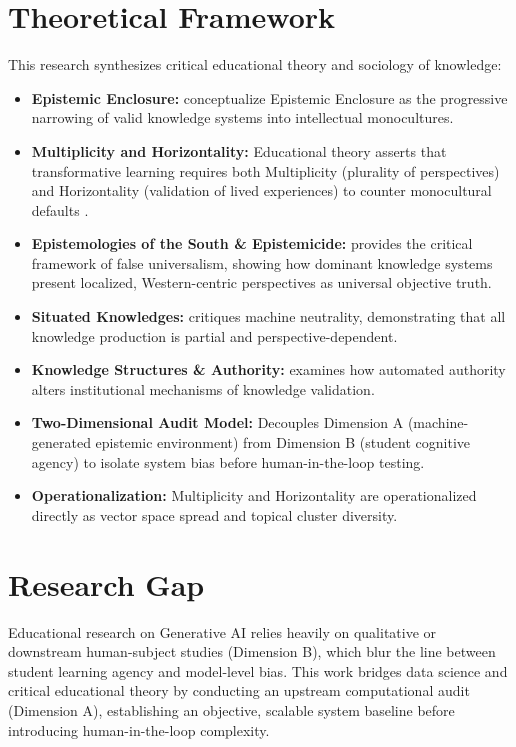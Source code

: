 \section{Theoretical Framework}
This research synthesizes critical educational theory and sociology of knowledge:
\begin{itemize}
  \item \textbf{Epistemic Enclosure:} \cite{Warren2020} conceptualize Epistemic Enclosure as the progressive narrowing of valid knowledge systems into intellectual monocultures.
  \item \textbf{Multiplicity and Horizontality:} Educational theory asserts that transformative learning requires both Multiplicity (plurality of perspectives) and Horizontality (validation of lived experiences) to counter monocultural defaults \cite{Warren2020}.
  \item \textbf{Epistemologies of the South \& Epistemicide:} \cite{Santos2014} provides the critical framework of false universalism, showing how dominant knowledge systems present localized, Western-centric perspectives as universal objective truth.
  \item \textbf{Situated Knowledges:} \cite{Haraway1988} critiques machine neutrality, demonstrating that all knowledge production is partial and perspective-dependent.
  \item \textbf{Knowledge Structures \& Authority:} \cite{Maton2014} examines how automated authority alters institutional mechanisms of knowledge validation.
  \item \textbf{Two-Dimensional Audit Model:} Decouples Dimension A (machine-generated epistemic environment) from Dimension B (student cognitive agency) to isolate system bias before human-in-the-loop testing.
  \item \textbf{Operationalization:} Multiplicity and Horizontality are operationalized directly as vector space spread and topical cluster diversity.
\end{itemize}

\section{Research Gap} %
Educational research on Generative AI relies heavily on qualitative or downstream human-subject studies (Dimension B), which blur the line between student learning agency and model-level bias. This work bridges data science and critical educational theory by conducting an upstream computational audit (Dimension A), establishing an objective, scalable system baseline before introducing human-in-the-loop complexity.
